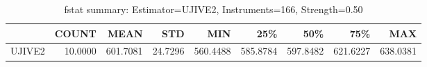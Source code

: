 \begin{table}[ht]
\centering
\caption{fstat summary: Estimator=UJIVE2, Instruments=166, Strength=0.50}
\begin{tabular}{lrrrrrrrr}
\toprule
 & COUNT & MEAN & STD & MIN & 25\% & 50\% & 75\% & MAX \\
\midrule
UJIVE2 & 10.0000 & 601.7081 & 24.7296 & 560.4488 & 585.8784 & 597.8482 & 621.6227 & 638.0381 \\
\bottomrule
\end{tabular}
\end{table}
